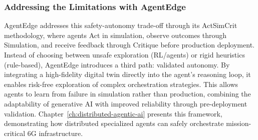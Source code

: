 \subsubsection{Addressing the Limitations with AgentEdge}

\ac{AgentEdge} addresses this safety-autonomy trade-off through its \ac{ActSimCrit} methodology, where agents Act in simulation, observe outcomes through Simulation, and receive feedback through Critique before production deployment. Instead of choosing between unsafe exploration (\ac{RL}/agents) or rigid heuristics (rule-based), \ac{AgentEdge} introduces a third path: validated autonomy. By integrating a high-fidelity digital twin directly into the agent's reasoning loop, it enables risk-free exploration of complex orchestration strategies. This allows agents to learn from failure in simulation rather than production, combining the adaptability of generative AI with improved reliability through pre-deployment validation. Chapter~\ref{ch:distributed-agentic-ai} presents this framework, demonstrating how distributed specialized agents can safely orchestrate mission-critical \ac{6G} infrastructure.
